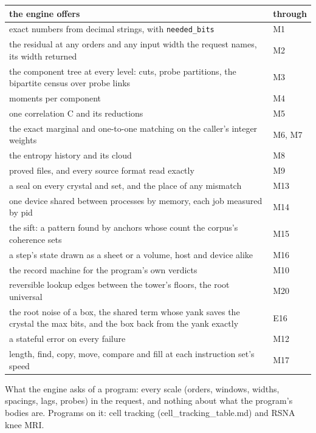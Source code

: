 {\small
\setlength{\tabcolsep}{6pt}
\begin{longtable}{>{\RaggedRight\arraybackslash}p{}>{\RaggedRight\arraybackslash}p{}}
\toprule
the engine offers & through \\
\midrule
\endhead
exact numbers from decimal strings, with \texttt{needed\_\allowbreak{}bits} & M1 \\
the residual at any orders and any input width the request names, its width returned & M2 \\
the component tree at every level: cuts, probe partitions, the bipartite census over probe links & M3 \\
moments per component & M4 \\
one correlation C and its reductions & M5 \\
the exact marginal and one-to-one matching on the caller's integer weights & M6, M7 \\
the entropy history and its cloud & M8 \\
proved files, and every source format read exactly & M9 \\
a seal on every crystal and set, and the place of any mismatch & M13 \\
one device shared between processes by memory, each job measured by pid & M14 \\
the sift: a pattern found by anchors whose count the corpus's coherence sets & M15 \\
a step's state drawn as a sheet or a volume, host and device alike & M16 \\
the record machine for the program's own verdicts & M10 \\
reversible lookup edges between the tower's floors, the root universal & M20 \\
the root noise of a box, the shared term whose yank saves the crystal the max bits, and the box back from the yank exactly & E16 \\
a stateful error on every failure & M12 \\
length, find, copy, move, compare and fill at each instruction set's speed & M17 \\
\bottomrule
\end{longtable}
}

What the engine asks of a program: every scale (orders, windows, widths, spacings, lags, probes) in the request, and nothing about what the program's bodies are. Programs on it: cell tracking (cell\_\allowbreak{}tracking\_\allowbreak{}table.md) and RSNA knee MRI.

